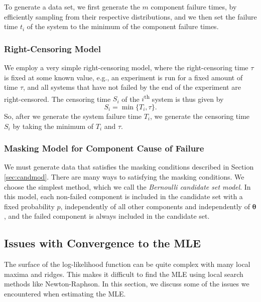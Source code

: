 \documentclass[
]{article}
\begin{document}
To generate a data set, we first generate the \(m\) component failure
times, by efficiently sampling from their respective distributions, and
we then set the failure time \(t_i\) of the system to the minimum of the
component failure times.

\hypertarget{right-censoring-model}{%
\subsubsection*{Right-Censoring Model}\label{right-censoring-model}}

We employ a very simple right-censoring model, where the right-censoring
time \(\tau\) is fixed at some known value, e.g., an experiment is run
for a fixed amount of time \(\tau\), and all systems that have not
failed by the end of the experiment are right-censored. The censoring
time \(S_i\) of the \(i\)\textsuperscript{th} system is thus given by \[
    S_i = \min\{T_i, \tau\}.
\] So, after we generate the system failure time \(T_i\), we generate
the censoring time \(S_i\) by taking the minimum of \(T_i\) and
\(\tau\).

\hypertarget{masking-model-for-component-cause-of-failure}{%
\subsubsection*{Masking Model for Component Cause of
Failure}\label{masking-model-for-component-cause-of-failure}}

We must generate data that satisfies the masking conditions described in
Section \ref{sec:candmod}. There are many ways to satisfying the masking
conditions. We choose the simplest method, which we call the
\emph{Bernoulli candidate set model}. In this model, each non-failed
component is included in the candidate set with a fixed probability
\(p\), independently of all other components and independently of
\(\boldsymbol{\theta}\), and the failed component is always included in
the candidate set.

\hypertarget{sec:opt_rescale}{%
\subsection{Issues with Convergence to the MLE}\label{sec:opt_rescale}}

The surface of the log-likelihood function can be quite complex with
many local maxima and ridges. This makes it difficult to find the MLE
using local search methods like Newton-Raphson. In this section, we
discuss some of the issues we encountered when estimating the MLE.
\end{document}
